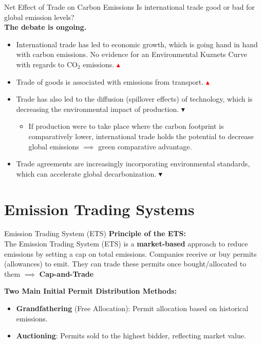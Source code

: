 \documentclass{beamer}
\begin{document}
\begin{frame}{Net Effect of Trade on Carbon Emissions}
    Is international trade good or bad for global emission levels? \pause \\
    \textbf{The debate is ongoing.} %
    \begin{itemize} \small
        \item International trade has led to economic growth, which is going hand in hand with carbon emissions. No evidence for an Environmental Kuznets Curve with regards to CO$_2$ emissions. \textcolor{red}{$\blacktriangle$}
        \item Trade of goods is associated with emissions from transport. \textcolor{red}{$\blacktriangle$}
        \item Trade has also led to the diffusion (spillover effects) of technology, which is decreasing the environmental impact of production. \textcolor{deepgreen}{$\blacktriangledown$}
        \begin{itemize} \footnotesize
             \item If production were to take place where the carbon footprint is comparatively lower, international trade holds the potential to decrease global emissions $\implies$ green comparative advantage.
        \end{itemize}
        \item Trade agreements are increasingly incorporating environmental standards, which can accelerate global decarbonization. \textcolor{deepgreen}{$\blacktriangledown$}
    \end{itemize}
\end{frame}

\section{Emission Trading Systems}

\begin{frame}{Emission Trading System (ETS)}
    \textbf{Principle of the ETS:} \\
    The Emission Trading System (ETS) is a \textbf{market-based} approach to reduce emissions by setting a cap on total emissions. Companies receive or buy permits (allowances) to emit. They can trade these permits once bought/allocated to them $\implies$ \textbf{Cap-and-Trade} \vspace{0.3cm}

    \textbf{Two Main Initial Permit Distribution Methods:}
    \begin{itemize}\small
        \item \textbf{Grandfathering} (Free Allocation): Permit allocation based on historical emissions.
        \item \textbf{Auctioning}: Permits sold to the highest bidder, reflecting market value.
    \end{itemize}
\end{frame}
\end{document}
